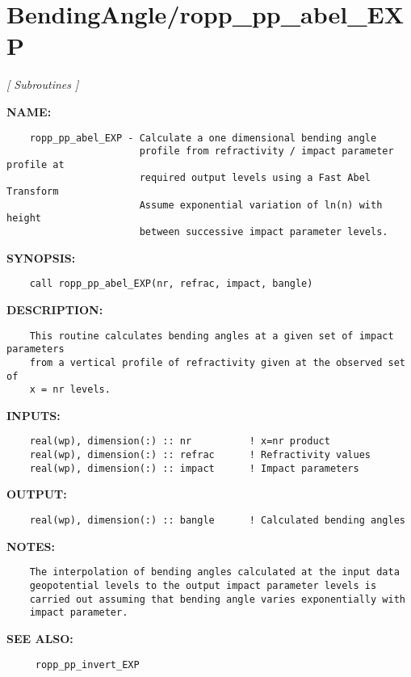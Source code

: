 \section{BendingAngle/ropp\_pp\_abel\_EXP}
\textsl{[ Subroutines ]}

\label{ch:robo0}
\label{ch:BendingAngle_ropp_pp_abel_EXP}
\textbf{NAME:}\hspace{0.08in}\begin{Verbatim}
    ropp_pp_abel_EXP - Calculate a one dimensional bending angle
                       profile from refractivity / impact parameter profile at
                       required output levels using a Fast Abel Transform
                       Assume exponential variation of ln(n) with height 
                       between successive impact parameter levels.
\end{Verbatim}
\textbf{SYNOPSIS:}\hspace{0.08in}\begin{Verbatim}
    call ropp_pp_abel_EXP(nr, refrac, impact, bangle)
\end{Verbatim}
\textbf{DESCRIPTION:}\hspace{0.08in}\begin{Verbatim}
    This routine calculates bending angles at a given set of impact parameters
    from a vertical profile of refractivity given at the observed set of 
    x = nr levels.
\end{Verbatim}
\textbf{INPUTS:}\hspace{0.08in}\begin{Verbatim}
    real(wp), dimension(:) :: nr          ! x=nr product
    real(wp), dimension(:) :: refrac      ! Refractivity values
    real(wp), dimension(:) :: impact      ! Impact parameters
\end{Verbatim}
\textbf{OUTPUT:}\hspace{0.08in}\begin{Verbatim}
    real(wp), dimension(:) :: bangle      ! Calculated bending angles
\end{Verbatim}
\textbf{NOTES:}\hspace{0.08in}\begin{Verbatim}
    The interpolation of bending angles calculated at the input data
    geopotential levels to the output impact parameter levels is
    carried out assuming that bending angle varies exponentially with
    impact parameter.
\end{Verbatim}
\textbf{SEE ALSO:}\hspace{0.08in}\begin{Verbatim}
     ropp_pp_invert_EXP
\end{Verbatim}
